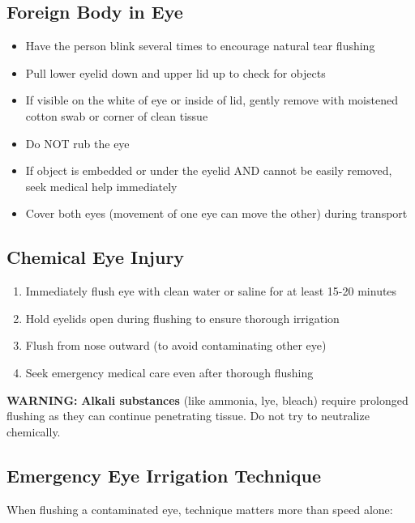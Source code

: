 \subsection{Foreign Body in Eye}

\begin{itemize}[leftmargin=*]
  \item Have the person blink several times to encourage natural tear flushing
  \item Pull lower eyelid down and upper lid up to check for objects
  \item If visible on the white of eye or inside of lid, gently remove with moistened cotton swab or corner of clean tissue
  \item Do NOT rub the eye
  \item If object is embedded or under the eyelid AND cannot be easily removed, seek medical help immediately
  \item Cover both eyes (movement of one eye can move the other) during transport
\end{itemize}

\subsection{Chemical Eye Injury}

\begin{enumerate}[leftmargin=*]
\item Immediately flush eye with clean water or saline for at least 15-20 minutes
\item Hold eyelids open during flushing to ensure thorough irrigation
\item Flush from nose outward (to avoid contaminating other eye)
\item Seek emergency medical care even after thorough flushing
\end{enumerate}
\textbf{WARNING:} \textbf{Alkali substances} (like ammonia, lye, bleach) require prolonged flushing as they can continue penetrating tissue. Do not try to neutralize chemically.

\subsection{Emergency Eye Irrigation Technique}

When flushing a contaminated eye, technique matters more than speed alone:

